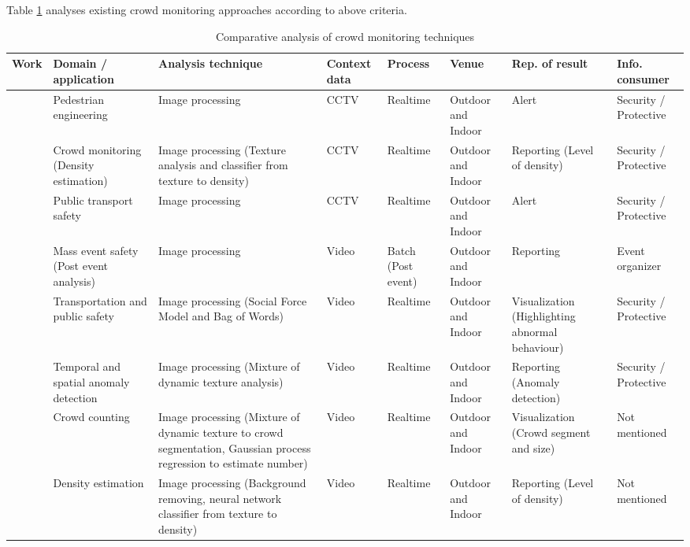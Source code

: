 Table \ref{table:crowdMonitoringTechAnalysis} analyses existing crowd monitoring approaches according to above criteria.

\begin{center}
	\begin{longtable}{|p{1.8cm}|p{2cm}|p{2cm}|p{1.8cm}|p{1.3cm}|p{1.3cm}|p{2cm}|p{1.3cm}|}
		\caption{Comparative analysis of crowd monitoring techniques}
		\label{table:crowdMonitoringTechAnalysis} \\
		\hline
		\textbf{Work} & \textbf{Domain / application} & \textbf{Analysis technique} & \textbf{Context data} & \textbf{Process} & \textbf{Venue} & \textbf{Rep. of result} & \textbf{Info. consumer} \\
		\hline
		\citet{Davies1995} & Pedestrian engineering & Image processing & CCTV & Realtime & Outdoor and Indoor & Alert & Security / Protective \\
		\hline
		\citet{Marana1997} & Crowd monitoring (Density estimation) & Image processing (Texture analysis and classifier from texture to density) & CCTV & Realtime & Outdoor and Indoor & Reporting (Level of density) & Security / Protective \\
		\hline
		\citet{Velastin1999} & Public transport safety & Image processing & CCTV & Realtime & Outdoor and Indoor & Alert & Security / Protective \\
		\hline
		\citet{Johansson2008} & Mass event safety (Post event analysis) & Image processing & Video & Batch (Post event) & Outdoor and Indoor & Reporting & Event organizer \\
		\hline
		\citet{Mehran2009} & Transportation and public safety & Image processing (Social Force Model and Bag of Words) & Video & Realtime & Outdoor and Indoor & Visualization (Highlighting abnormal behaviour) & Security / Protective \\
		\hline
		\citet{Mahadevan2010} & Temporal and spatial anomaly detection & Image processing (Mixture of dynamic texture analysis) & Video & Realtime & Outdoor and Indoor & Reporting (Anomaly detection) & Security / Protective \\
		\hline
		\citet{Chan2008} & Crowd counting & Image processing (Mixture of dynamic texture to crowd segmentation, Gaussian process regression to estimate number) & Video & Realtime & Outdoor and Indoor & Visualization (Crowd segment and size) & Not mentioned \\
		\hline
		\citet{Li2010} & Density estimation & Image processing (Background removing, neural network classifier from texture to density) & Video & Realtime & Outdoor and Indoor & Reporting (Level of density) & Not mentioned \\

\end{longtable}
\end{center}
